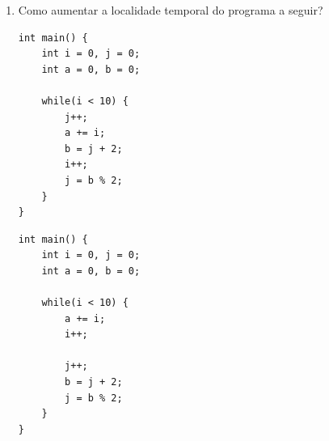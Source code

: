 \documentclass{article}
\begin{document}
\begin{enumerate}
\begin{center}
\begin{minipage}{0.575\textwidth}
\begin{lstlisting}[frame=single]
    return 0;
}
        \end{lstlisting}
    \end{minipage}
\end{center}

\begin{center}
    \begin{minipage}{0.575\textwidth}
        \begin{lstlisting}[frame=single]
int main() {
    int i, j;
    int m[8][8], a[8][8], b[8][8]; 
    
    for(i = 0; i < 8; i ++)
        for(j = 0; j < 8; j ++)
            m[i][j] = a[i][j] + b[i][j];
    
    return 0;
}
        \end{lstlisting}
    \end{minipage}
\end{center}

\item Como aumentar a localidade temporal do programa a seguir?

\begin{center}
    \begin{minipage}{0.35\textwidth}
        \begin{lstlisting}[frame=single]
int main() {
    int i = 0, j = 0;
    int a = 0, b = 0;
    
    while(i < 10) {
        j++;
        a += i;
        b = j + 2;
        i++;
        j = b % 2;
    }
}
        \end{lstlisting}
    \end{minipage}
\end{center}

\begin{center}
    \begin{minipage}{0.35\textwidth}
        \begin{lstlisting}[frame=single]
int main() {
    int i = 0, j = 0;
    int a = 0, b = 0;
    
    while(i < 10) {
        a += i;
        i++;
        
        j++;
        b = j + 2;
        j = b % 2;
    }
}
        \end{lstlisting}
    \end{minipage}
\end{center}


\end{enumerate}
\end{document}
